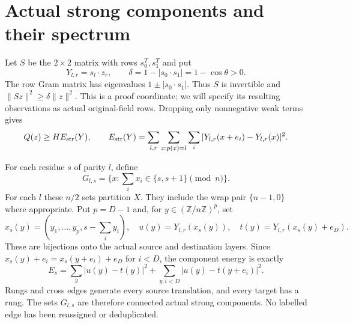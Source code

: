 \documentclass[11pt,a4paper]{article}
\newcommand{\Z}{\mathbb Z}
\newcommand{\norm}[1]{\lVert#1\rVert}
\begin{document}
\section{Actual strong components and their spectrum}\label{sec:graph}
Let $S$ be the $2\times2$ matrix with rows $s_0^T,s_1^T$ and put
\begin{equation}\label{eq:delta}
 Y_{l,r}=s_l\cdot z_r,\qquad
 \delta=1-|s_0\cdot s_1|=1-\cos\theta>0.
\end{equation}
The row Gram matrix has eigenvalues $1\pm|s_0\cdot s_1|$. Thus $S$ is
invertible and $\norm{Sz}^2\geq\delta\norm{z}^2$. This is a proof coordinate;
we will specify its resulting observations as actual original-field rows.
Dropping only nonnegative weak terms gives
\begin{equation}\label{eq:strong}
 Q(z)\geq H E_{\rm str}(Y),\qquad
 E_{\rm str}(Y)=\sum_{l,r}\sum_{x:p(x)=l}\sum_i
 |Y_{l,r}(x+e_i)-Y_{l,r}(x)|^2.
\end{equation}

For each residue $s$ of parity $l$, define
\[
 G_{l,s}=\{x:\textstyle\sum_i x_i\in\{s,s+1\}\pmod n\}.
\]
For each $l$ these $n/2$ sets partition $X$. They include the wrap pair
$\{n-1,0\}$ where appropriate. Put $p=D-1$ and, for $y\in(\Z/n\Z)^p$, set
\[
 x_s(y)=(y_1,\ldots,y_p,s-\textstyle\sum_i y_i),\quad
 u(y)=Y_{l,r}(x_s(y)),\quad t(y)=Y_{l,r}(x_s(y)+e_D).
\]
These are bijections onto the actual source and destination layers. Since
$x_s(y)+e_i=x_s(y+e_i)+e_D$ for $i<D$, the component energy is exactly
\begin{equation}\label{eq:layers}
 E_s=\sum_y|u(y)-t(y)|^2+
       \sum_{y,i<D}|u(y)-t(y+e_i)|^2.
\end{equation}
Rungs and cross edges generate every source translation, and every target
has a rung. The sets $G_{l,s}$ are therefore connected actual strong
components. No labelled edge has been reassigned or deduplicated.
\end{document}
